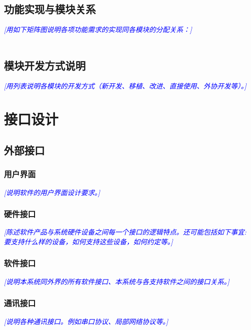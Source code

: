 \documentclass[12pt,a4pape，titlepager]{article}
\newcommand{\bluefont}[1]{\textcolor{blue}{\emph{[#1]}}}
\begin{document}
	\subsection{功能实现与模块关系}{
		\bluefont{用如下矩阵图说明各项功能需求的实现同各模块的分配关系：}\\ \\
	\subsection{模块开发方式说明}{
		\bluefont{用列表说明各模块的开发方式（新开发、移植、改进、直接使用、外协开发等）。}
	}
	}	
	
	\section{接口设计}
	\subsection{外部接口}
	\subsubsection{用户界面}{
		\bluefont{说明软件的用户界面设计要求。}
	}
	\subsubsection{硬件接口}{
		\bluefont{陈述软件产品与系统硬件设备之间每一个接口的逻辑特点。还可能包括如下事宜: 要支持什么样的设备，如何支持这些设备，如何约定等。}
	}
	\subsubsection{软件接口}{
		\bluefont{说明本系统同外界的所有软件接口、本系统与各支持软件之间的接口关系。}
	}
	\subsubsection{通讯接口}{
		\bluefont{说明各种通讯接口。例如串口协议、局部网络协议等。}
	}
\end{document}
